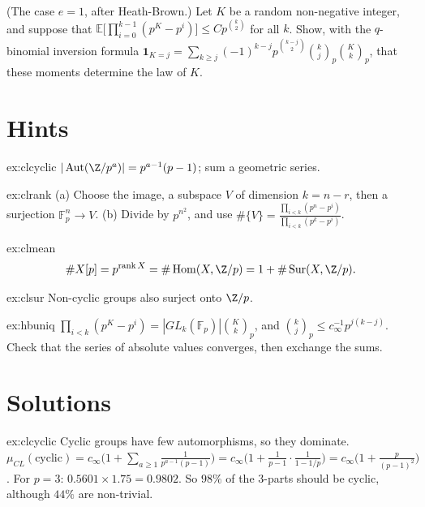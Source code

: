 \begin{exercise}[$\star\star$]\label{ex:hbuniq}
(The case $e=1$, after Heath-Brown.) Let $K$ be a random non-negative integer, and suppose that $\mathbb E\bigl[\prod_{i=0}^{k-1}(p^K-p^i)\bigr]\le Cp^{\binom k2}$ for all $k$. Show, with the $q$-binomial inversion formula $\mathbf 1_{K=j}=\sum_{k\ge j}(-1)^{k-j}p^{\binom{k-j}2}\binom kj_p\binom Kk_p$, that these moments determine the law of $K$.
\end{exercise}

\section{Hints}

\begin{hint}{ex:clcyclic}
$|\operatorname{Aut}(\Z/p^a)|=p^{a-1}(p-1)$; sum a geometric series.
\end{hint}
\begin{hint}{ex:clrank}
(a) Choose the image, a subspace $V$ of dimension $k=n-r$, then a surjection $\mathbb F_p^n\to V$. (b) Divide by $p^{n^2}$, and use $\#\{V\}=\frac{\prod_{i<k}(p^n-p^i)}{\prod_{i<k}(p^k-p^i)}$.
\end{hint}
\begin{hint}{ex:clmean}
\[\#X[p]=p^{\operatorname{rank}X}=\#\operatorname{Hom}(X,\Z/p)=1+\#\operatorname{Sur}(X,\Z/p).\]
\end{hint}
\begin{hint}{ex:clsur}
Non-cyclic groups also surject onto $\Z/p$.
\end{hint}
\begin{hint}{ex:hbuniq}
$\prod_{i<k}(p^K-p^i)=|GL_k(\mathbb F_p)|\binom Kk_p$, and $\binom kj_p\le c_\infty^{-1}p^{j(k-j)}$. Check that the series of absolute values converges, then exchange the sums.
\end{hint}

\section{Solutions}

\begin{solution}{ex:clcyclic}
\idea Cyclic groups have few automorphisms, so they dominate.
\writeup $\mu_{CL}(\text{cyclic})=c_\infty\bigl(1+\sum_{a\ge1}\frac1{p^{a-1}(p-1)}\bigr)=c_\infty\bigl(1+\frac1{p-1}\cdot\frac1{1-1/p}\bigr)=c_\infty\bigl(1+\frac p{(p-1)^2}\bigr)$. For $p=3$: $0.5601\times1.75=0.9802$. So $98\%$ of the $3$-parts should be cyclic, although $44\%$ are non-trivial.
\end{solution}

